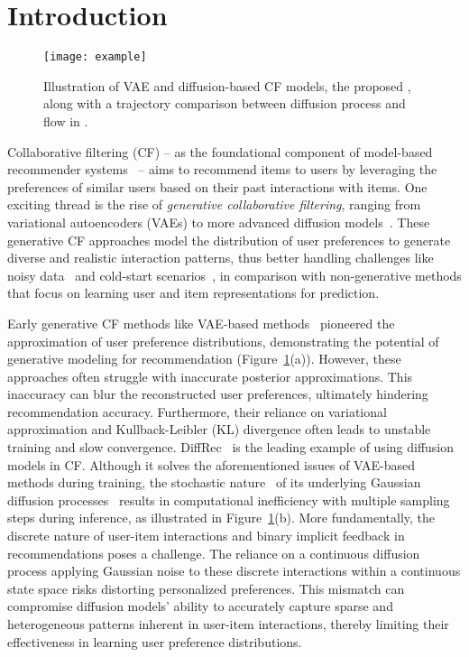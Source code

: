 \documentclass[sigconf]{acmart}
\begin{document}
\maketitle

\section{Introduction}

\begin{figure}[t]
    \texttt{[image: example]}
    \caption{Illustration of VAE and diffusion-based CF models, the proposed \ours, along with a trajectory comparison between diffusion process and flow in \ours.}
    \label{fig:intro_example}
\end{figure}

Collaborative filtering (CF) -- as the foundational component of model-based recommender systems~\cite{schafer2007collaborative, koren2021advances} -- aims to recommend items to users by leveraging the preferences of similar users based on their past interactions with items. One exciting thread is the rise of \textit{generative collaborative filtering}, ranging from variational autoencoders (VAEs) \cite{kingma2013auto} to more advanced diffusion models~\cite{ho2020denoising, song2020score}. These generative CF approaches model the distribution of user preferences to generate diverse and realistic interaction patterns, thus better handling challenges like noisy data~\cite{wang2021denoising} and cold-start scenarios~\cite{chen2022generative}, in comparison with non-generative methods that focus on learning user and item representations for prediction.

Early generative CF methods like VAE-based methods~\cite{liang2018variational, ma2019learning, shenbin2020recvae} pioneered the approximation of user preference distributions, demonstrating the potential of generative modeling for recommendation (Figure~\ref{fig:intro_example}(a)). However, these approaches often struggle with inaccurate posterior approximations. This inaccuracy can blur the reconstructed user preferences, ultimately hindering recommendation accuracy. Furthermore, their reliance on variational approximation and Kullback-Leibler (KL) divergence often leads to unstable training and slow convergence. 
DiffRec~\cite{wang2023diffusion} is the leading example of using diffusion models in CF. Although it solves the aforementioned issues of VAE-based methods during training, the stochastic nature~\cite{song2020score} of its underlying Gaussian diffusion processes~\cite{sohl2015deep, ho2020denoising} results in computational inefficiency with multiple sampling steps during inference, as illustrated in Figure~\ref{fig:intro_example}(b). 
More fundamentally, the discrete nature of user-item interactions and binary implicit feedback in recommendations poses a challenge. The reliance on a continuous diffusion process applying Gaussian noise to these discrete interactions within a continuous state space risks distorting personalized preferences. This mismatch can compromise diffusion models' ability to accurately capture sparse and heterogeneous patterns inherent in user-item interactions, thereby limiting their effectiveness in learning user preference distributions.
\end{document}
